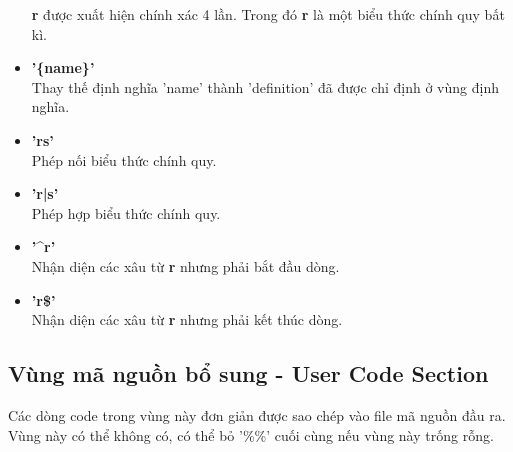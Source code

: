 \documentclass[../report.tex]{subfiles}
\begin{document}
\begin{itemize}
    \textbf{r} được xuất hiện chính xác 4 lần. Trong đó \textbf{r} là một biểu thức chính quy bất kì. 
\item \textbf{'\{name\}'} \\
    Thay thế định nghĩa 'name' thành 'definition' đã được chỉ định ở vùng định nghĩa. 
\item \textbf{'rs'} \\
    Phép nối biểu thức chính quy. 
\item \textbf{'r|s'} \\
    Phép hợp biểu thức chính quy. 
\item \textbf{'\textasciicircum r'} \\
    Nhận diện các xâu từ \textbf{r} nhưng phải bắt đầu dòng. 
\item \textbf{'r\$'} \\
    Nhận diện các xâu từ \textbf{r} nhưng phải kết thúc dòng. 
    
\end{itemize}

\subsection{Vùng mã nguồn bổ sung - User Code Section}
Các dòng code trong vùng này đơn giản được sao chép vào file mã nguồn đầu ra. 
Vùng này có thể không có, có thể bỏ '\%\%' cuối cùng nếu vùng này trống rỗng.  
\end{document}

